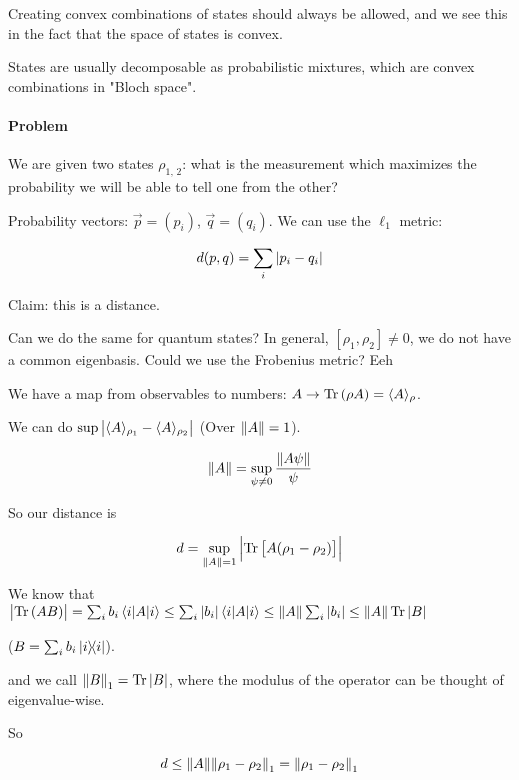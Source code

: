 Creating convex combinations of states should always be allowed,  and we see this in the fact that the space of states is convex.

States are usually decomposable as probabilistic mixtures, which are convex combinations in "Bloch space".

\paragraph{Problem} We are given two states \(\rho _{1, \, 2}\): what is the measurement which maximizes the probability we will be able to tell one from the other?

Probability vectors: \(\vec{p} = (p_i)\), \(\vec{q} = (q_i)\). We can use the \(\ell_1\) metric:

\begin{equation}
  d(p, q) = \sum_i \abs{p_i - q_i}
\end{equation}

Claim: this is a distance.

Can we do the same for quantum states? In general, \([\rho_1,  \rho_2] \neq 0\), we do not have a common eigenbasis. Could we use the Frobenius metric? Eeh

We have a map from observables to numbers: \(A \rightarrow \Tr \qty(\rho A) = \langle A \rangle_\rho\).

We can do \(\sup{\abs{{\langle A \rangle_{\rho_1} - \langle A \rangle_{\rho_2}}}}\) (Over \(\norm{A} = 1\)).

\begin{equation}
  \norm{A} = \sup_{\psi \neq 0} \frac{\norm{A\psi}}{\psi}
\end{equation}


So our distance is

\begin{equation}
  d = \sup_{\norm{A}=1} \abs{\Tr \qty[A(\rho_1 - \rho_2)]}
\end{equation}

We know that \(\abs{\Tr \qty(AB)} = \sum_i b_i \ev{A}{i} \leq \sum_i \abs{b_i} \ev{A}{i} \leq \norm{A} \sum_i \abs{b_i} \leq \norm{A} \Tr \abs{B}\)

(\(B = \sum_i b_i \ketbra{i}\)).

and we call \(\norm{B}_1 = \Tr \abs{B}\), where the modulus of the operator can be thought of eigenvalue-wise.

So

\begin{equation}
  d \leq \norm{A} \norm{\rho_1 - \rho_2}_1 = \norm{\rho_1 - \rho_2}_1
\end{equation}

